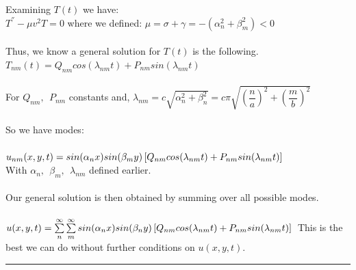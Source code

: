 \documentclass[fleqn]{article}
\begin{document}
\begin{enumerate}
\begin{enumerate}
      \textcolor{hwColor}{ 
        Examining $T(t)$ we have: \\
        $T^{''}-\mu v^2 T=0$ where we defined: $\mu=\sigma+\gamma=-(\alpha_n^2+\beta_m^2)<0$ \\
        \\
        Thus, we know a general solution for $T(t)$ is the following. \\
        $T_{nm}(t)=Q_{nm} cos(\lambda_{nm}t)+P_{nm} sin(\lambda_{nm}t)$ \\
        \\
        For $Q_{nm}, ~~ P_{nm}$ constants and, $\lambda_{nm}=c\sqrt{\alpha_n^2+\beta_n^2}=c\pi \sqrt{(\dfrac{n}{a})^2+(\dfrac{m}{b})^2}$ \\
        \\
        So we have modes: \\
        \\
        $
          u_{nm}(x,y,t)=sin(\alpha_n x) sin(\beta_m y)\left[Q_{nm} cos(\lambda_{nm}t)+P_{nm} sin(\lambda_{nm}t)\right] \\
        $\\
        With $\alpha_n, ~~ \beta_m, ~~ \lambda_{nm}$ defined earlier. \\
        \\
        Our general solution is then obtained by summing over all possible modes. \\
        \\
        $
          u(x,y,t)=\sum\limits_{n}^{\infty} \sum\limits_{m}^{\infty} sin(\alpha_n x) sin(\beta_n y)\left[Q_{nm} cos(\lambda_{nm}t)+P_{nm} sin(\lambda_{nm}t)\right] \\
          \\
        $
        This is the best we can do without further conditions on $u(x,y,t)$.
      }

      \textcolor{hwColor}{ 
        \rule{16cm}{1pt} 
      }


\end{enumerate}
\end{enumerate}
\end{document}

